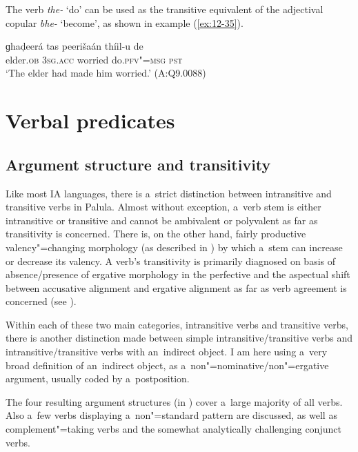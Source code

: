  The verb \textit{the-} `do' can be used as the transitive equivalent of the adjectival copular \textit{bhe-} `become', as shown in example (\ref{ex:12-35}).

\begin{exe}
\ex
\label{ex:12-35}
\gll ɡhaḍeerá tas peerišaán thíil-u de \\
elder.\textsc{ob} \textsc{3sg.acc} worried do.\textsc{pfv"=msg} \textsc{pst} \\
\glt `The elder had made him worried.' (A:Q9.0088)
\end{exe}

\section{Verbal predicates}
\label{sec:12-2}

\subsection{Argument structure and transitivity}
\label{subsec:12-2-1}


Like most IA languages, there is a~strict distinction between intransitive and transitive verbs in Palula. Almost without exception, a~verb stem is either intransitive or transitive and cannot be ambivalent or polyvalent as far as transitivity is concerned. There is, on the other hand, fairly productive valency"=changing morphology (as described in ) by which a~stem can increase or decrease its valency. A verb's transitivity is primarily diagnosed on basis of absence/presence of ergative morphology in the perfective and the aspectual shift between accusative alignment and ergative alignment as far as verb agreement is concerned (see ). 


Within each of these two main categories, intransitive verbs and transitive verbs, there is another distinction made between simple intransitive/transitive verbs and intransitive/transitive verbs with an~indirect object. I am here using a~very broad definition of an~indirect object, as a~non"=nominative/non"=ergative argument, usually coded by a~postposition. 


The four resulting argument structures (in ) cover a~large majority of all verbs. Also a~few verbs displaying a~non"=standard pattern are discussed, as well as complement"=taking verbs and the somewhat analytically challenging conjunct verbs.


